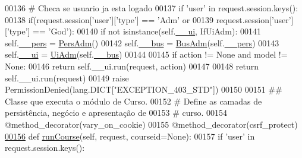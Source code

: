 \begin{DoxyCode}
00136         \textcolor{comment}{# Checa se usuario ja esta logado}
00137         \textcolor{keywordflow}{if} \textcolor{stringliteral}{'user'} \textcolor{keywordflow}{in} request.session.keys():
00138             if(request.session[\textcolor{stringliteral}{'user'}][\textcolor{stringliteral}{'type'}] == \textcolor{stringliteral}{'Adm'} \textcolor{keywordflow}{or}
00139                request.session[\textcolor{stringliteral}{'user'}][\textcolor{stringliteral}{'type'}] == \textcolor{stringliteral}{'God'}):
00140                 \textcolor{keywordflow}{if} \textcolor{keywordflow}{not} isinstance(self.\hyperlink{classELO_1_1MainUnit_1_1Factory_a189a44a11e1a66ba69663eb2c598dd7c}{\_\_ui}, IfUiAdm):
00141                     self.\hyperlink{classELO_1_1MainUnit_1_1Factory_a68f6640ad3b515e1b8cd48d1554c0779}{\_\_pers} = \hyperlink{classAdm_1_1AdmUnit_1_1PersAdm}{PersAdm}()
00142                     self.\hyperlink{classELO_1_1MainUnit_1_1Factory_a6a0b7b93046e095779ba54e0a8a4d02c}{\_\_bus} = \hyperlink{classAdm_1_1AdmUnit_1_1BusAdm}{BusAdm}(self.\hyperlink{classELO_1_1MainUnit_1_1Factory_a68f6640ad3b515e1b8cd48d1554c0779}{\_\_pers})
00143                     self.\hyperlink{classELO_1_1MainUnit_1_1Factory_a189a44a11e1a66ba69663eb2c598dd7c}{\_\_ui} = \hyperlink{classAdm_1_1AdmUnit_1_1UiAdm}{UiAdm}(self.\hyperlink{classELO_1_1MainUnit_1_1Factory_a6a0b7b93046e095779ba54e0a8a4d02c}{\_\_bus}) 
00144                 
00145                 \textcolor{keywordflow}{if} action != \textcolor{keywordtype}{None} \textcolor{keywordflow}{and} model != \textcolor{keywordtype}{None}:
00146                     \textcolor{keywordflow}{return} self.\_\_ui.run(request, action)
00147                 
00148                 \textcolor{keywordflow}{return} self.\_\_ui.run(request)
00149         \textcolor{keywordflow}{raise} PermissionDenied(lang.DICT[\textcolor{stringliteral}{"EXCEPTION\_403\_STD"}])
00150 
00151     \textcolor{comment}{## Classe que executa o módulo de Curso.}
00152     \textcolor{comment}{#   Define as camadas de persistência, negócio e apresentação de}
00153     \textcolor{comment}{#   curso.}
00154     @method\_decorator(vary\_on\_cookie)
00155     @method\_decorator(csrf\_protect)
\hypertarget{MainUnit_8py_source_l00156}{}\hyperlink{classELO_1_1MainUnit_1_1Factory_a5e360bc5396fd576e0614b9e157b3816}{00156}     \textcolor{keyword}{def }\hyperlink{classELO_1_1MainUnit_1_1Factory_a5e360bc5396fd576e0614b9e157b3816}{runCourse}(self, request, courseid=None):
00157         \textcolor{keywordflow}{if} \textcolor{stringliteral}{'user'} \textcolor{keywordflow}{in} request.session.keys():

\end{DoxyCode}

